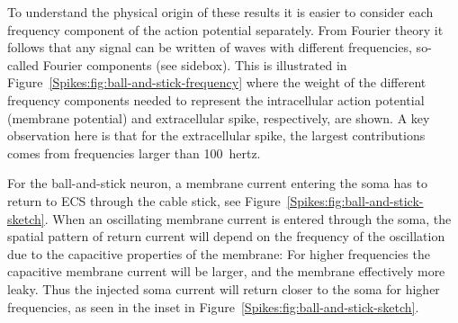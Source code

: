 To understand the physical origin of these results it is easier to consider each frequency 
component of the action potential separately. From Fourier theory it follows that any signal
can be written of waves with different frequencies, so-called Fourier components (see sidebox).  
This is illustrated in Figure~\ref{Spikes:fig:ball-and-stick-frequency} where the weight of the different frequency components needed to
represent the intracellular action potential (membrane potential) and extracellular spike, respectively, are shown.
A key observation here is that for the extracellular spike, the largest
contributions comes from frequencies larger than 100~hertz.

For the ball-and-stick neuron, a membrane current entering the soma has to return to ECS through the cable
stick, see Figure~\ref{Spikes:fig:ball-and-stick-sketch}.
When an oscillating membrane current is entered through the soma, the spatial pattern of return current will depend on the frequency of the oscillation due to the capacitive properties of the membrane: For higher frequencies the capacitive membrane current will be larger, and the 
membrane effectively more leaky. Thus the injected soma current will return closer to the soma for higher frequencies, 
as  seen in the inset in Figure~\ref{Spikes:fig:ball-and-stick-sketch}.  



